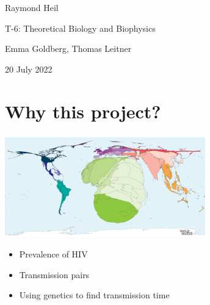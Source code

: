 \documentclass[aspectratio=169]{beamer}
\begin{document}
\begin{frame}

    \begin{center}

        \vfill

        Raymond Heil

        T-6: Theoretical Biology and Biophysics

        Emma Goldberg, Thomas Leitner

        \vfill

        \scriptsize{20 July 2022}

    \end{center}


\end{frame}

\section{Why this project?}

\begin{frame} \frametitle{\insertsection}

    \centering\includegraphics[width=0.65\textwidth]{images/hiv-cartogram}
    
    \begin{itemize}
        \item{Prevalence of HIV}
        \item{Transmission pairs}
        \item{Using genetics to find transmission time}
    \end{itemize}


\end{frame}
\end{document}
